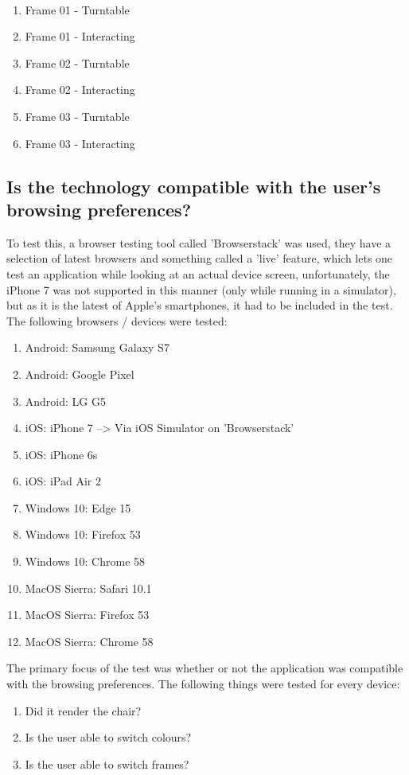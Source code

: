 ​\begin{enumerate}
\item {Frame 01 - Turntable}
\item {Frame 01 - Interacting}
\item {Frame 02 - Turntable}
\item {Frame 02 - Interacting}
\item {Frame 03 - Turntable}
\item {Frame 03 - Interacting}
\end{enumerate}

\subsection{Is the technology compatible with the user's browsing preferences?}
To test this, a browser testing tool called 'Browserstack' was used, they have a selection of latest browsers and something called a 'live' feature, which lets one test an application while looking at an actual device screen, unfortunately, the iPhone 7 was not supported in this manner (only while running in a simulator), but as it is the latest of Apple's smartphones, it had to be included in the test. The following browsers / devices were tested:
\label{subsub:browsingprefs}
​\begin{enumerate}
\item {Android: Samsung Galaxy S7}
\item {Android: Google Pixel}
\item {Android: LG G5}
\item {iOS: iPhone 7 --> Via iOS Simulator on 'Browserstack'}
\item {iOS: iPhone 6s}
\item {iOS: iPad Air 2}
\item {Windows 10: Edge 15}
\item {Windows 10: Firefox 53}
\item {Windows 10: Chrome 58}
\item {MacOS Sierra: Safari 10.1}
\item {MacOS Sierra: Firefox 53}
\item {MacOS Sierra: Chrome 58}
\end{enumerate}

The primary focus of the test was whether or not the application was compatible with the browsing preferences. The following things were tested for every device:
​\begin{enumerate}
\item {Did it render the chair?}
\item {Is the user able to switch colours?}
\item {Is the user able to switch frames?}
\end{enumerate}
